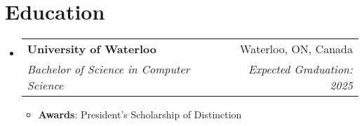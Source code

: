 \documentclass[letterpaper,11pt]{article}
\makeatletter
\newcommand{\resumeItem}[1]{
  \item\small{
    {#1 \vspace{-2pt}}
  }
}
\newcommand{\resumeSubheading}[4]{
  \vspace{-2pt}\item
    \begin{tabular*}{0.97\textwidth}[t]{l@{\extracolsep{\fill}}r}
      \textbf{#1} & #2 \\
      \textit{\small#3} & \textit{\small #4} \\
    \end{tabular*}\vspace{-7pt}
}
\newcommand{\resumeSubHeadingListStart}{\begin{itemize}[leftmargin=0.15in, label={}]}
\newcommand{\resumeSubHeadingListEnd}{\end{itemize}}
\newcommand{\resumeItemListStart}{\begin{itemize}}
\newcommand{\resumeItemListEnd}{\end{itemize}\vspace{-5pt}}
\makeatother
\begin{document}
\section{Education}
  \resumeSubHeadingListStart
    \resumeSubheading
      {University of Waterloo}{Waterloo, ON, Canada}
      {Bachelor of Science in Computer Science}{Expected Graduation: 2025}
      \resumeItemListStart
            \resumeItem{\textbf {Awards}: President’s Scholarship of Distinction}
          \resumeItemListEnd
  \resumeSubHeadingListEnd
\end{document}
